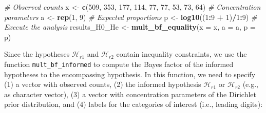 \documentclass[
  english,
  man,floatsintext]{apa6}
\newenvironment{Shaded}{\begin{snugshade}}{\end{snugshade}}
\newcommand{\CommentTok}[1]{\textcolor[rgb]{0.56,0.35,0.01}{\textit{#1}}}
\newcommand{\DataTypeTok}[1]{\textcolor[rgb]{0.13,0.29,0.53}{#1}}
\newcommand{\DecValTok}[1]{\textcolor[rgb]{0.00,0.00,0.81}{#1}}
\newcommand{\KeywordTok}[1]{\textcolor[rgb]{0.13,0.29,0.53}{\textbf{#1}}}
\newcommand{\NormalTok}[1]{#1}
\newcommand{\OperatorTok}[1]{\textcolor[rgb]{0.81,0.36,0.00}{\textbf{#1}}}
\newcommand{\StringTok}[1]{\textcolor[rgb]{0.31,0.60,0.02}{#1}}
\begin{document}
\begin{Shaded}
\begin{Highlighting}[]
\CommentTok{\# Observed counts}
\NormalTok{x \textless{}{-}}\StringTok{ }\KeywordTok{c}\NormalTok{(}\DecValTok{509}\NormalTok{, }\DecValTok{353}\NormalTok{, }\DecValTok{177}\NormalTok{, }\DecValTok{114}\NormalTok{,  }\DecValTok{77}\NormalTok{,  }\DecValTok{77}\NormalTok{,  }\DecValTok{53}\NormalTok{,  }\DecValTok{73}\NormalTok{,  }\DecValTok{64}\NormalTok{)}
\CommentTok{\# Concentration parameters}
\NormalTok{a \textless{}{-}}\StringTok{  }\KeywordTok{rep}\NormalTok{(}\DecValTok{1}\NormalTok{, }\DecValTok{9}\NormalTok{)}
\CommentTok{\# Expected proportions}
\NormalTok{p \textless{}{-}}\StringTok{ }\KeywordTok{log10}\NormalTok{((}\DecValTok{1}\OperatorTok{:}\DecValTok{9} \OperatorTok{+}\StringTok{ }\DecValTok{1}\NormalTok{)}\OperatorTok{/}\DecValTok{1}\OperatorTok{:}\DecValTok{9}\NormalTok{)}
\CommentTok{\# Execute the analysis}
\NormalTok{results\_H0\_He  \textless{}{-}}\StringTok{ }\KeywordTok{mult\_bf\_equality}\NormalTok{(}\DataTypeTok{x =}\NormalTok{ x, }\DataTypeTok{a =}\NormalTok{ a, }\DataTypeTok{p =}\NormalTok{ p)}
\end{Highlighting}
\end{Shaded}

Since the hypotheses \(\mathcal{H}_{r1}\) and \(\mathcal{H}_{r2}\) contain inequality constraints, we use the function \texttt{mult\_bf\_informed} to compute the Bayes factor of the informed hypotheses to the encompassing hypothesis. In this function, we need to specify (1) a vector with observed counts, (2) the informed hypothesis \(\mathcal{H}_{r1}\) or \(\mathcal{H}_{r2}\) (e.g., as character vector), (3) a vector with concentration parameters of the Dirichlet prior distribution, and (4) labels for the categories of interest (i.e., leading digits):
\end{document}
